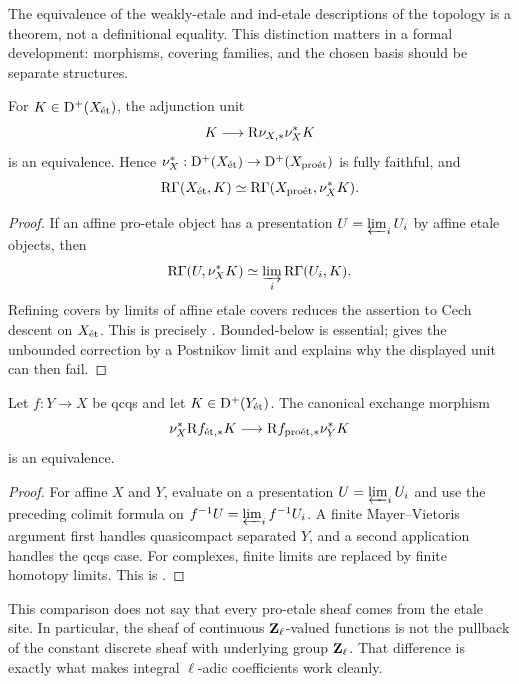 The equivalence of the weakly-etale and ind-etale descriptions of the
topology is a theorem, not a definitional equality.  This distinction matters
in a formal development: morphisms, covering families, and the chosen basis
should be separate structures.

\begin{proposition}
\label{prop:proetale-etale-comparison}
For \(K\in\mathrm D^+(X_{\mathrm{\acute et}})\), the adjunction unit
\[
 K\longrightarrow \mathrm R\nu_{X,*}\nu_X^*K
\]
is an equivalence.  Hence
\(\nu_X^*:\mathrm D^+(X_{\mathrm{\acute et}})\to\mathrm D^+(X_{\mathrm{pro\acute et}})\) is fully faithful, and
\[
 \mathrm R\Gamma(X_{\mathrm{\acute et}},K)
   \simeq \mathrm R\Gamma(X_{\mathrm{pro\acute et}},\nu_X^*K).
\]
\end{proposition}

\begin{proof}
If an affine pro-etale object has a presentation \(U=\varprojlim_iU_i\) by
affine etale objects, then
\[
 \mathrm R\Gamma(U,\nu_X^*K)
   \simeq\varinjlim_i\mathrm R\Gamma(U_i,K).
\]
Refining covers by limits of affine etale covers reduces the assertion to
Cech descent on \(X_{\mathrm{\acute et}}\).  This is precisely
\cite[Corollary~5.1.6]{BhattScholzeProEtale}.  Bounded-below is essential;
\cite[Remark~5.1.8]{BhattScholzeProEtale} gives the unbounded correction by
a Postnikov limit and explains why the displayed unit can then fail.
\end{proof}

\begin{proposition}
\label{prop:proetale-pushforward-comparison}
Let \(f:Y\to X\) be qcqs and let \(K\in\mathrm D^+(Y_{\mathrm{\acute et}})\).  The canonical
exchange morphism
\[
 \nu_X^*\mathrm R f_{\mathrm{\acute et},*}K
   \longrightarrow
 \mathrm R f_{\mathrm{pro\acute et},*}\nu_Y^*K
\]
is an equivalence.
\end{proposition}

\begin{proof}
For affine \(X\) and \(Y\), evaluate on a presentation
\(U=\varprojlim_iU_i\) and use the preceding colimit formula on
\(f^{-1}U=\varprojlim_i f^{-1}U_i\).  A finite Mayer--Vietoris argument first
handles quasicompact separated \(Y\), and a second application handles the
qcqs case.  For complexes, finite limits are replaced by finite homotopy
limits.  This is \cite[Lemma~5.4.3]{BhattScholzeProEtale}.
\end{proof}

\begin{warning}
This comparison does not say that every pro-etale sheaf comes from the etale
site.  In particular, the sheaf of continuous \(\mathbf Z_\ell\)-valued functions is not
the pullback of the constant discrete sheaf with underlying group \(\mathbf Z_\ell\).
That difference is exactly what makes integral \(\ell\)-adic coefficients
work cleanly.
\end{warning}

